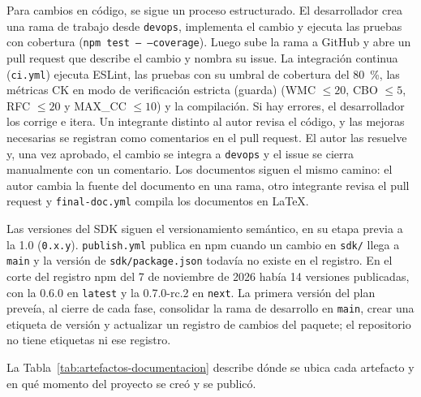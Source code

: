Para cambios en código, se sigue un proceso estructurado. El desarrollador crea una rama de trabajo desde \texttt{devops}, implementa el cambio y ejecuta las pruebas con cobertura (\texttt{npm test -- --coverage}). Luego sube la rama a GitHub y abre un pull request que describe el cambio y nombra su issue. La integración continua (\texttt{ci.yml}) ejecuta ESLint, las pruebas con su umbral de cobertura del 80~\%, las métricas CK en modo de verificación estricta (guarda) (WMC $\le 20$, CBO $\le 5$, RFC $\le 20$ y MAX\_CC $\le 10$) y la compilación. Si hay errores, el desarrollador los corrige e itera. Un integrante distinto al autor revisa el código, y las mejoras necesarias se registran como comentarios en el pull request. El autor las resuelve y, una vez aprobado, el cambio se integra a \texttt{devops} y el issue se cierra manualmente con un comentario. Los documentos siguen el mismo camino: el autor cambia la fuente del documento en una rama, otro integrante revisa el pull request y \texttt{final-doc.yml} compila los documentos en LaTeX.

Las versiones del SDK siguen el versionamiento semántico, en su etapa previa a la 1.0 (\texttt{0.x.y}). \texttt{publish.yml} publica en npm cuando un cambio en \texttt{sdk/} llega a \texttt{main} y la versión de \texttt{sdk/package.json} todavía no existe en el registro. En el corte del registro npm del 7 de noviembre de 2026 había 14 versiones publicadas, con la 0.6.0 en \texttt{latest} y la 0.7.0-rc.2 en \texttt{next}. La primera versión del plan preveía, al cierre de cada fase, consolidar la rama de desarrollo en \texttt{main}, crear una etiqueta de versión y actualizar un registro de cambios del paquete; el repositorio no tiene etiquetas ni ese registro.

La Tabla~\ref{tab:artefactos-documentacion} describe dónde se ubica cada artefacto y en qué momento del proyecto se creó y se publicó.

